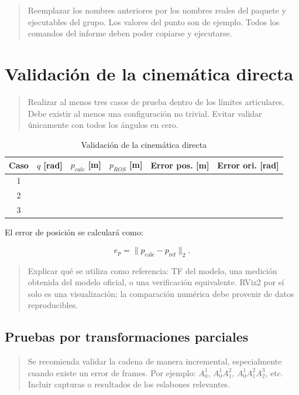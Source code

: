 \documentclass[journal]{IEEEtran}
\newcommand{\instr}[1]{%
\begin{quote}
\small
\noindent\textbf{\color{blue}{INSTRUCCIÓN:}} #1
\end{quote}
}
\newcommand{\pendiente}[1]{\textbf{\color{red}{[#1]}}}
\begin{document}
\instr{Reemplazar los nombres anteriores por los nombres reales del paquete y ejecutables del grupo. Los valores del punto son de ejemplo. Todos los comandos del informe deben poder copiarse y ejecutarse.}

\section{Validación de la cinemática directa}

\instr{Realizar al menos tres casos de prueba dentro de los límites articulares. Debe existir al menos una configuración no trivial. Evitar validar únicamente con todos los ángulos en cero.}

\begin{table}[t]
\centering
\caption{Validación de la cinemática directa}
\label{tab:fk_validation}
\begin{tabular}{cccccc}
\toprule
\textbf{Caso} &
\textbf{$q$ [rad]} &
\textbf{$p_{calc}$ [m]} &
\textbf{$p_{ROS}$ [m]} &
\textbf{Error pos. [m]} &
\textbf{Error ori. [rad]} \\
\midrule
1 & \pendiente{...} & \pendiente{...} & \pendiente{...} & \pendiente{...} & \pendiente{...} \\
2 & \pendiente{...} & \pendiente{...} & \pendiente{...} & \pendiente{...} & \pendiente{...} \\
3 & \pendiente{...} & \pendiente{...} & \pendiente{...} & \pendiente{...} & \pendiente{...} \\
\bottomrule
\end{tabular}
\end{table}

El error de posición se calculará como:

\begin{equation}
e_p =
\|p_{\text{calc}}-p_{\text{ref}}\|_2.
\end{equation}

\instr{Explicar qué se utiliza como referencia: TF del modelo, una medición obtenida del modelo oficial, o una verificación equivalente. RViz2 por sí solo es una visualización; la comparación numérica debe provenir de datos reproducibles.}

\subsection{Pruebas por transformaciones parciales}

\instr{Se recomienda validar la cadena de manera incremental, especialmente cuando existe un error de frames. Por ejemplo: $A_0^1$, $A_0^1A_1^2$, $A_0^1A_1^2A_2^3$, etc. Incluir capturas o resultados de los eslabones relevantes.}
\end{document}
